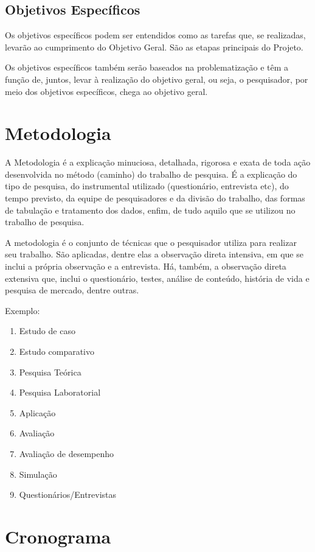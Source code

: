 \documentclass[12pt,article,a4paper,brazil,oldfontcommands,oneside]{abntex2}
\begin{document}
\subsection{Objetivos Específicos}

Os objetivos específicos podem ser entendidos como as tarefas que, se realizadas, levarão ao cumprimento do Objetivo Geral. São as etapas principais do Projeto.

Os objetivos específicos também serão baseados na problematização e têm a função de, juntos, levar à realização do objetivo geral, ou seja, o pesquisador, por meio dos objetivos específicos, chega ao objetivo geral. 

\section{Metodologia}

A Metodologia é a explicação minuciosa, detalhada, rigorosa e exata de toda ação desenvolvida no método (caminho) do trabalho de pesquisa. É a explicação do tipo de pesquisa, do instrumental utilizado (questionário, entrevista etc), do tempo previsto, da equipe de pesquisadores e da divisão do trabalho, das formas de tabulação e tratamento dos dados, enfim, de tudo aquilo que se utilizou no trabalho de pesquisa.

A metodologia é o conjunto de técnicas que o pesquisador utiliza para realizar seu trabalho. São aplicadas, dentre elas a observação direta intensiva, em que se inclui a própria observação e a entrevista. Há, também, a observação direta extensiva que, inclui o questionário, testes, análise de conteúdo, história de vida e pesquisa de mercado, dentre outras.

Exemplo:
\begin{enumerate}
\item Estudo de caso
\item Estudo comparativo
\item Pesquisa Teórica
\item Pesquisa Laboratorial
\item Aplicação
\item Avaliação
\item Avaliação de desempenho
\item Simulação
\item Questionários/Entrevistas 
\end{enumerate}


\section{Cronograma}
\end{document}
